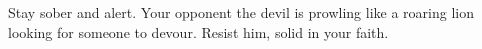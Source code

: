 \lettrine[loversize=0.15,lines=2]{S}{}tay sober and alert. Your opponent the devil is prowling like a roaring lion looking for someone to devour. Resist him, solid in your faith.
